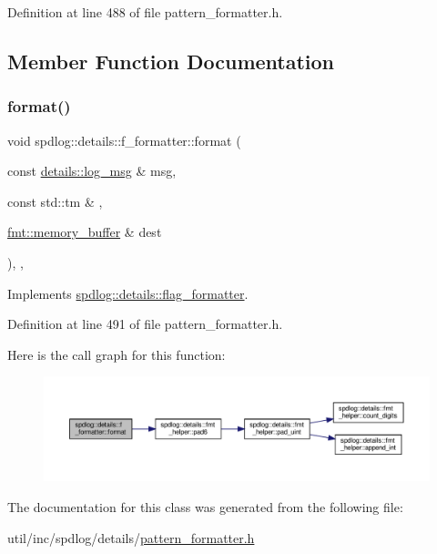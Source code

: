 Definition at line 488 of file pattern\+\_\+formatter.\+h.



\subsection{Member Function Documentation}
\mbox{\label{classspdlog_1_1details_1_1f__formatter_ab3af92f69f6a1b4a70189f4e2a7ccbba}} 
\subsubsection{\texorpdfstring{format()}{format()}}
{\footnotesize\ttfamily void spdlog\+::details\+::f\+\_\+formatter\+::format (\begin{DoxyParamCaption}\item[{const \hyperlink{structspdlog_1_1details_1_1log__msg}{details\+::log\+\_\+msg} \&}]{msg,  }\item[{const std\+::tm \&}]{,  }\item[{\hyperlink{format_8h_a21cbf729f69302f578e6db21c5e9e0d2}{fmt\+::memory\+\_\+buffer} \&}]{dest }\end{DoxyParamCaption})\hspace{0.3cm}{\ttfamily [inline]}, {\ttfamily [override]}, {\ttfamily [virtual]}}



Implements \hyperlink{classspdlog_1_1details_1_1flag__formatter_a33fb3e42a4c8200cceb833d92b53fb67}{spdlog\+::details\+::flag\+\_\+formatter}.



Definition at line 491 of file pattern\+\_\+formatter.\+h.

Here is the call graph for this function\+:
\nopagebreak
\begin{figure}[H]
\begin{center}
\leavevmode
\includegraphics[width=350pt]{classspdlog_1_1details_1_1f__formatter_ab3af92f69f6a1b4a70189f4e2a7ccbba_cgraph}
\end{center}
\end{figure}


The documentation for this class was generated from the following file\+:\begin{DoxyCompactItemize}
\item 
util/inc/spdlog/details/\hyperlink{pattern__formatter_8h}{pattern\+\_\+formatter.\+h}\end{DoxyCompactItemize}
